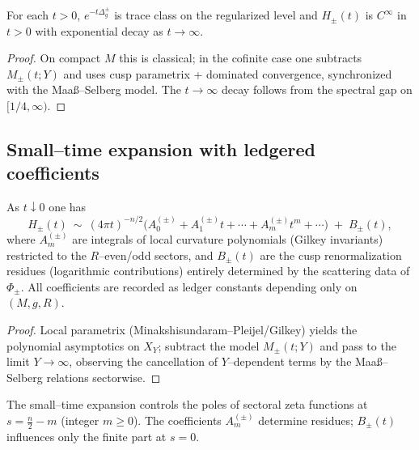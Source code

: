 \begin{lemma}
\label{lem:heat-traceclass}
For each $t>0$, $e^{-t\Delta_g^\pm}$ is trace class on the regularized level and $H_\pm(t)$ is $C^\infty$ in $t>0$ with exponential decay as $t\to\infty$.
\end{lemma}

\begin{proof}
On compact $M$ this is classical; in the cofinite case one subtracts $M_\pm(t;Y)$ and uses cusp parametrix + dominated convergence, synchronized with the Maaß–Selberg model. The $t\to\infty$ decay follows from the spectral gap on $[1/4,\infty)$. %
\end{proof}


\subsection{Small–time expansion with ledgered coefficients}
\label{subsec:ch6-part2-smalltime} \relax \hspace{0pt}
\begin{theorem}
\label{thm:small-time}
As $t\downarrow0$ one has
\[
H_\pm(t)\ \sim\ (4\pi t)^{-n/2}\Big(A_0^{(\pm)}+A_1^{(\pm)} t + \cdots + A_m^{(\pm)} t^m+\cdots\Big)\;+\;B_\pm(t),
\]
where $A_m^{(\pm)}$ are integrals of local curvature polynomials (Gilkey invariants) restricted to the $R$–even/odd sectors, and $B_\pm(t)$ are the cusp renormalization residues (logarithmic contributions) entirely determined by the scattering data of $\Phi_\pm$. All coefficients are recorded as ledger constants depending only on $(M,g,R)$.
\end{theorem}

\begin{proof}
Local parametrix (Minakshisundaram–Pleijel/Gilkey) yields the polynomial asymptotics on $X_Y$; subtract the model $M_\pm(t;Y)$ and pass to the limit $Y\to\infty$, observing the cancellation of $Y$–dependent terms by the Maaß–Selberg relations sectorwise. %
\end{proof}

\begin{remark}
\label{rem:pole-ledger}
The small–time expansion controls the poles of sectoral zeta functions at $s=\tfrac{n}{2}-m$ (integer $m\ge0$). The coefficients $A_m^{(\pm)}$ determine residues; $B_\pm(t)$ influences only the finite part at $s=0$. %
\end{remark}

